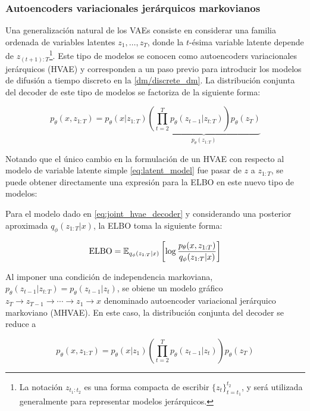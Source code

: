 \subsubsection{Autoencoders variacionales jerárquicos markovianos}

Una generalización natural de los VAEs consiste en considerar una familia ordenada de variables latentes $z_1,\ldots,z_T$, donde la $t$-ésima variable latente depende de $z_{(t+1):T}$\footnote{La notación $z_{t_1:t_2}$ es una forma compacta de escribir $\{z_t\}_{t=t_1}^{t_2}$, y será utilizada generalmente para representar modelos jerárquicos.}. Este tipo de modelos se conocen como autoencoders variacionales jerárquicos (HVAE) y corresponden a un paso previo para introducir los modelos de difusión a tiempo discreto en la \autoref{dm/discrete_dm}. La distribución conjunta del decoder de este tipo de modelos se factoriza de la siguiente forma:

\begin{equation}
    \label{eq:joint_hvae_decoder}
    p_\theta(x, z_{1:T})
    = p_\theta(x|z_{1:T})\underbrace{
        \left(\prod_{t=2}^{T} p_\theta(z_{t-1}|z_{t:T})\right)
        p_\theta(z_T)}_{p_\theta(z_{1:T})}
\end{equation}

Notando que el único cambio en la formulación de un HVAE con respecto al modelo de variable latente simple \eqref{eq:latent_model} fue pasar de $z$ a $z_{1:T}$, se puede obtener directamente una expresión para la ELBO en este nuevo tipo de modelos:

\begin{prop}
    Para el modelo dado en \eqref{eq:joint_hvae_decoder} y considerando una posterior aproximada $q_\phi(z_{1:T}|x)$, la ELBO toma la siguiente forma:

    \begin{equation}
        \label{eq:elbo_mhvae}
        \operatorname{ELBO}
        = \mathbb{E}_{q_\phi(z_{1:T}|x)}\left[\log\frac{p_\theta(x,z_{1:T})}{q_\phi(z_{1:T}|x)}\right]
    \end{equation}
\end{prop}

Al imponer una condición de independencia markoviana, $p_\theta(z_{t-1}|z_{t:T})=p_\theta(z_{t-1}|z_t)$, se obiene un modelo gráfico $z_T\to z_{T-1}\to\cdots\to z_1\to x$ denominado autoencoder variacional jerárquico markoviano (MHVAE). En este caso, la distribución conjunta del decoder se reduce a

\begin{equation*}
    p_\theta(x, z_{1:T})
    = p_\theta(x|z_1)\left(\prod_{t=2}^{T}
    p_\theta(z_{t-1}|z_t)\right)
    p_\theta(z_T)
\end{equation*}

